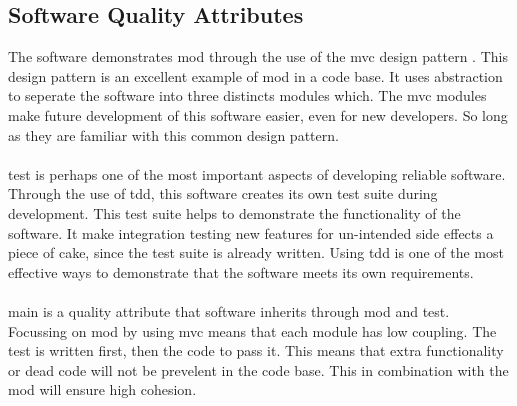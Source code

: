 \documentclass{article}
\newcommand{\comment}[1]{}
\begin{document}
\subsection{Software Quality Attributes}
\comment{
Specify any additional quality characteristics for the product that will be omportant to either the customer or the developer. Some to consider are adaptability, availability, correctness, flexibility, interoperability, maintaintability, portability, reliability, reusability, robustness, testability, and usability. Write these to be specific, quantative and verifiable where possible. At least, clarify the relative preferences for various attributes, such as ease of use over ease of learning.dd
	}
The software demonstrates \gls{mod} through the use of the \acrshort{mvc} design pattern \parencite{designpatterns97}. This design pattern is an excellent example of \gls{mod} in a code base. It uses abstraction to seperate the software into three distincts modules which. The \acrfull{mvc} modules make future development of this software easier, even for new developers. So long as they are familiar with this common design pattern.
\\ \\
\Gls{test} is perhaps one of the most important aspects of developing reliable software. Through the use of \acrshort{tdd}, this software creates its own test suite during development. This test suite helps to demonstrate the functionality of the software. It make integration testing new features for un-intended side effects a piece of cake, since the test suite is already written. Using \acrshort{tdd} is one of the most effective ways to demonstrate that the software meets its own requirements.
\\ \\
\Gls{main} is a quality attribute that software inherits through \gls{mod} and \gls{test}. Focussing on \gls{mod} by using \gls{mvc} means that each module has low coupling. The test is written first, then the code to pass it. This means that extra functionality or dead code will not be prevelent in the code base. This in combination with the \gls{mod} will ensure high cohesion.
\end{document}
